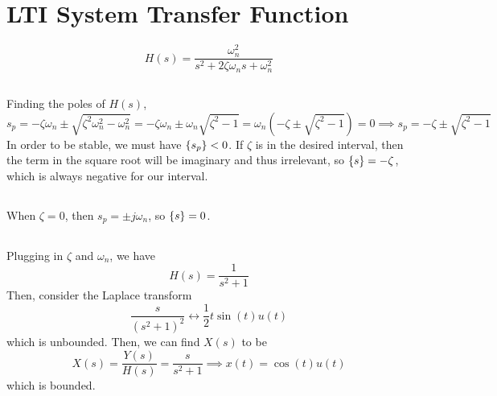 \documentclass{article}
\let\Re\relax
\DeclareMathOperator{\Re}{\mathfrak{R}}
\begin{document}
\section{LTI System Transfer Function}

\begin{equation}
    H(s) = \frac{\omega_n^2}{s^2 + 2\zeta \omega_n s + \omega_n^2}
\end{equation}

\subsection{}

Finding the poles of \(H(s)\),
\begin{equation}
    s_p = -\zeta \omega_n \pm \sqrt{\zeta^2 \omega_n^2 - \omega_n^2} = -\zeta \omega_n \pm \omega_n \sqrt{\zeta^2 - 1} = \omega_n (-\zeta \pm \sqrt{\zeta^2 - 1}) = 0 \implies s_p = -\zeta \pm \sqrt{\zeta^2 - 1}
\end{equation}
In order to be stable, we must have \(\Re\{s_p\} < 0\).
If \(\zeta\) is in the desired interval, then the term in the square root will be imaginary and thus irrelevant, so \(\Re\{s\} = -\zeta\), which is always negative for our interval.

\subsection{}

When \(\zeta = 0\), then \(s_p = \pm j\omega_n\), so \(\Re\{s\} = 0\).

\subsection{}

Plugging in \(\zeta\) and \(\omega_n\), we have
\begin{equation}
    H(s) = \frac{1}{s^2 + 1}
\end{equation}
Then, consider the Laplace transform
\begin{equation}
    \frac{s}{(s^2 + 1)^2} \longleftrightarrow \frac{1}{2} t \sin(t) u(t)
\end{equation}
which is unbounded.
Then, we can find \(X(s)\) to be
\begin{equation}
    X(s) = \frac{Y(s)}{H(s)} = \frac{s}{s^2 + 1} \implies x(t) = \cos(t) u(t)
\end{equation}
which is bounded.

\subsection{}
\end{document}
